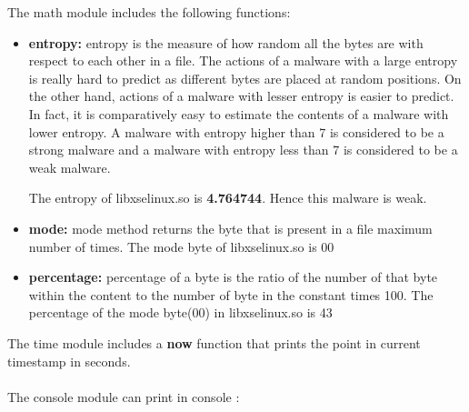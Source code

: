 The math module includes the following functions:

\begin{itemize}


    \item \textbf{entropy: } entropy is the measure of how random all the bytes are with respect to each other in a file. The actions of a malware with a large entropy is really hard to predict as different bytes are placed at random positions. On the other hand, actions of a malware with lesser entropy is easier to predict. In fact, it is comparatively easy to estimate the contents of a malware with lower entropy. A malware with entropy higher than 7 is considered to be a strong malware and a malware with entropy less than 7 is considered to be a weak malware.

    The entropy of libxselinux.so is \textbf{4.764744}. Hence this malware is weak.

    \item \textbf{mode: } mode method returns the byte that is present in a file maximum number of times. The mode byte of libxselinux.so is 00

    \item \textbf{percentage: } percentage of a byte is the ratio of the number of that byte within the content to the number of byte in the constant times 100. The percentage of the mode byte(00) in libxselinux.so is 43%

    
\end{itemize}
The time module includes a \textbf{now} function that prints the point in current timestamp in seconds. 
\\
\\
The console module can print in console :